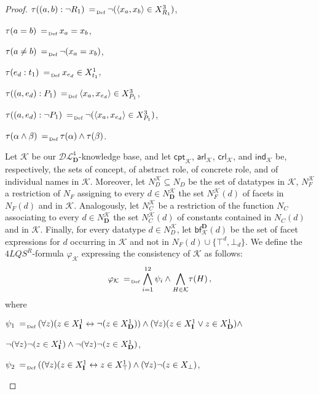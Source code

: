 \documentclass[a4paper]{llncs}
\newcommand{\defAs}{\mathrel{\makebox{\:= \hspace{-.2cm} \raisebox{-0.5 ex}[0 ex][0 ex]{\tiny Def}}}}
\newcommand{\shdlss}{\mathcal{DL}_{\D}^{4}}
\newcommand{\flqsr}{\ensuremath{4LQS^R}}
\newcommand{\I}{\mathbf{I}}
\newcommand{\D}{\mathbf{D}}
\newcommand{\ck}{\mathsf{cpt}_\mathcal{K}}
\newcommand{\ark}{\mathsf{arl}_\mathcal{K}}
\newcommand{\crk}{\mathsf{crl}_\mathcal{K}}
\newcommand{\ik}{\mathsf{ind}_\mathcal{K}}
\newcommand{\bfk}{\mathsf{bf}_\mathcal{K}^{\D}}
\begin{document}
\begin{proof}
{\noindent $\tau((a,b) : \neg R_1) \defAs \neg(\langle x_a, x_b\rangle \in X_{R_1}^3)$,

\noindent $\tau(a=b) \defAs x_a = x_b$,

\noindent $\tau(a\neq b) \defAs \neg (x_a = x_b)$,

\noindent $\tau(e_d : t_1) \defAs x_{e_d} \in X_{t_1}^1$,

\noindent $\tau((a,e_d) : P_1) \defAs \langle x_a, x_{e_d}\rangle \in X_{P_1}^3$,

\noindent $\tau((a,e_d) : \neg P_1) \defAs \neg(\langle x_a, x_{e_d}\rangle \in X_{P_1}^3)$,

\noindent $\tau(\alpha \wedge \beta) \defAs \tau(\alpha) \wedge \tau(\beta)$.
}

\smallskip

Let $\mathcal{K}$ be our $\shdlss$-knowledge base, and let $\ck$, $\ark$, $\crk$, and $\ik$ be, respectively, the sets of concept, of abstract role, of concrete role, and of individual names in $\mathcal{K}$. Moreover, let $N_{D}^\mathcal{K} \subseteq N_{D}$ be the set of datatypes in $\mathcal{K}$, $N_{F}^\mathcal{K}$ a restriction of $N_{F}$ assigning to every $d \in N_{\D}^\mathcal{K}$ the set $N_{F}^\mathcal{K}(d)$ of facets in $N_{F}(d)$ and in $\mathcal{K}$. Analogously, let $N_{C}^{\mathcal{K}}$ be a restriction of the function $N_{C}$ associating to every $d \in N_{\D}^\mathcal{K}$ the set $N_{C}^\mathcal{K}(d)$ of constants  contained in $N_{C}(d)$ and in $\mathcal{K}$. Finally, for every datatype $d \in N_{D}^\mathcal{K}$, let $\bfk(d)$ be the set of facet expressions for $d$ occurring in $\mathcal{K}$ and not in $N_{F}(d) \cup \{\top^{d},\bot_{d}\}$. We define the \flqsr-formula $\varphi_{\mathcal{K}}$ expressing the consistency of $\mathcal{K}$ as follows: {\small
\[
\varphi_{\mathcal{K}} \defAs \bigwedge_{i=1}^{12}\psi_i \wedge \underset {H \in \mathcal{K}}\bigwedge \tau(H) \, ,
\]}
where

\begin{itemize}{\small
\item[-] $\psi_1 \defAs (\forall z)(z \in X_{\I}^1 \leftrightarrow \neg(z \in X_{\D}^1))\wedge (\forall z)(z \in X_{\I}^1 \vee z \in X_{\D}^1)\wedge$

$\hfill \neg (\forall z)\neg (z \in X_{\I}^1) \wedge \neg (\forall z)\neg (z \in X_{\D}^1)$,

\item[-] $\psi_2 \defAs ((\forall z)(z \in X_{\I}^1 \leftrightarrow z \in X_{\top}^1) \wedge (\forall z)\neg (z \in X_{\bot})$,

}
\end{itemize}
\end{proof}
\end{document}
